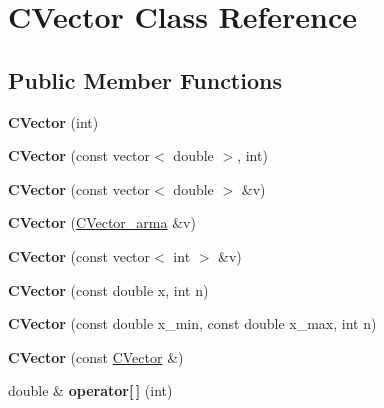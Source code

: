 \hypertarget{class_c_vector}{}\section{C\+Vector Class Reference}
\label{class_c_vector}
\subsection*{Public Member Functions}
\begin{DoxyCompactItemize}
\item 
\mbox{\label{class_c_vector_abfde6cebb1be01b0998f27433b25ced5}} 
{\bfseries C\+Vector} (int)
\item 
\mbox{\label{class_c_vector_a7b783f983e3249b801e58ad63ca3d9ce}} 
{\bfseries C\+Vector} (const vector$<$ double $>$, int)
\item 
\mbox{\label{class_c_vector_afc9695fa8255edc4e889f9a7db3c3b8d}} 
{\bfseries C\+Vector} (const vector$<$ double $>$ \&v)
\item 
\mbox{\label{class_c_vector_a3e5db0f6cb06cecff0d4a84d6dbc3ffc}} 
{\bfseries C\+Vector} (\hyperlink{class_c_vector__arma}{C\+Vector\+\_\+arma} \&v)
\item 
\mbox{\label{class_c_vector_aa469c7c30625e2745015ace43b3fb322}} 
{\bfseries C\+Vector} (const vector$<$ int $>$ \&v)
\item 
\mbox{\label{class_c_vector_ab18107be1c5c6686a70805cc7bf9da23}} 
{\bfseries C\+Vector} (const double x, int n)
\item 
\mbox{\label{class_c_vector_abdcca719a09e744d1283da5331408237}} 
{\bfseries C\+Vector} (const double x\+\_\+min, const double x\+\_\+max, int n)
\item 
\mbox{\label{class_c_vector_aa6c7b9d08252767b0d772b2374f77b07}} 
{\bfseries C\+Vector} (const \hyperlink{class_c_vector}{C\+Vector} \&)
\item 
\mbox{\label{class_c_vector_aa47e8a777843df4b2b50342e02ab234e}} 
double \& {\bfseries operator\mbox{[}$\,$\mbox{]}} (int)

\end{DoxyCompactItemize}
